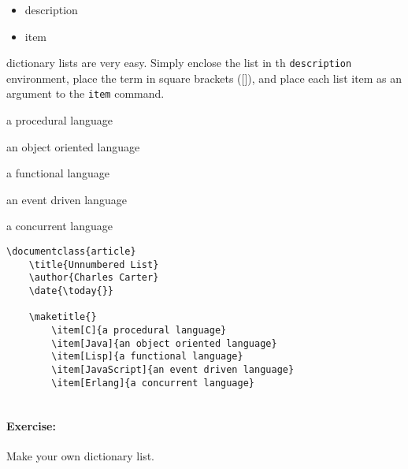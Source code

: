         \begin{framed}
            \begin{itemize}
                \item{description}
                \item{item}
            \end{itemize}
        \end{framed}

        \Lx{} dictionary lists are very easy. Simply enclose the list in th \texttt{description} environment, place the term in square brackets ([]), and place each list item as an argument to the \texttt{item} command.

    \begin{description}
    \label{lists:dictionary}
        \item[C]{a procedural language}
        \item[Java]{an object oriented language}
        \item[Lisp]{a functional language}
        \item[JavaScript]{an event driven language}
        \item[Erlang]{a concurrent language}
    \end{description}

        \begin{verbatim}
\documentclass{article}
    \title{Unnumbered List}
    \author{Charles Carter}
    \date{\today{}}
 
    \maketitle{}
        \item[C]{a procedural language}
        \item[Java]{an object oriented language}
        \item[Lisp]{a functional language}
        \item[JavaScript]{an event driven language}
        \item[Erlang]{a concurrent language}
    
        \end{verbatim}

        \paragraph{Exercise:} Make your own dictionary list.

